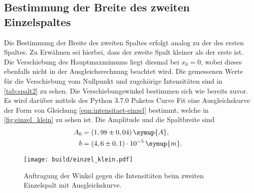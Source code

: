 \subsection{Bestimmung der Breite des zweiten Einzelspaltes}
    Die Bestimmung der Breite des zweiten Spaltes erfolgt analog zu der des ersten Spaltes. Zu Erwähnen sei hierbei, dass der zweite Spalt kleiner 
    als der erste ist. Die Verschiebung des Hauptmaxmimums liegt diesmal bei $x_0 = 0$, wobei dieses ebenfalls nicht in der Ausgleichsrechnung
    beachtet wird. Die gemessenen Werte für die Verschiebung vom Nullpunkt und zugehörige Intensitäten sind 
    in \autoref{tab:spalt2} zu sehen. Die Verschiebungswinkel bestimmen sich wie bereits zuvor.
    Es wird darüber mittels des Python 3.7.0 Paketes Curve Fit eine Ausgleichskurve der Form von Gleichung 
    \eqref{eqn:intensitaet-einzel} bestimmt, welche in \autoref{fig:einzel_klein} zu sehen ist. Die Amplitude und die Spaltbreite sind 
    \begin{align*}
        A_0 &= (1,98 \pm 0,04)           \, \symup{A}, \\
        b &= (4,6 \pm 0,1) \cdot 10^{-5} \, \symup{m}. 
    \end{align*}
    
    \begin{figure}
        \centering
        \texttt{[image: build/einzel\_klein.pdf]}
        \caption{Auftragung der Winkel gegen die Intensitäten beim zweiten Einzelspalt mit Ausgleichskurve.}
        \label{fig:einzel_klein}
    \end{figure}

